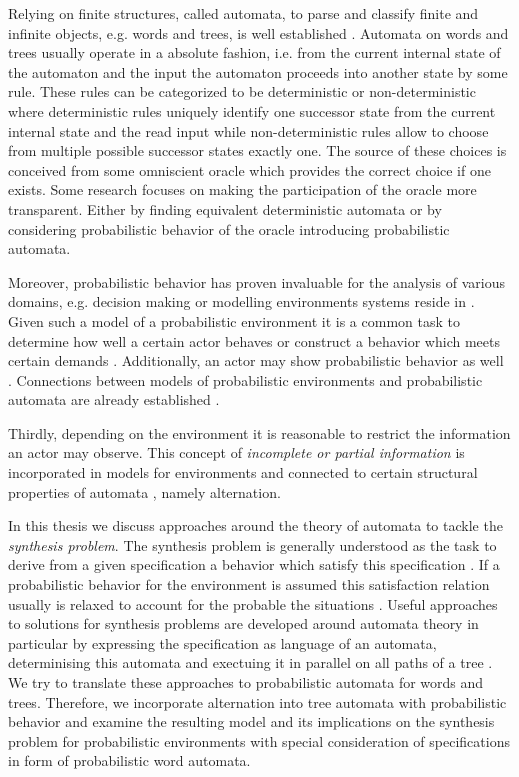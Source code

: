 Relying on finite structures, called automata, to parse and classify finite and
infinite objects, e.g. words and trees, is well established \cite{LangAutoLog,%
AutoInfObj}. Automata on words and trees usually operate in a absolute fashion,
i.e. from the current internal state of the automaton and the input the
automaton proceeds into another state by some rule. These rules can be
categorized to be deterministic or non-deterministic where deterministic rules
uniquely identify one successor state from the current internal state and the
read input while non-deterministic rules allow to choose from multiple possible
successor states exactly one. The source of these choices is conceived from
some omniscient oracle which provides the correct choice if one exists. Some
research focuses on making the participation of the oracle more transparent.
Either by finding equivalent deterministic automata
\cite{NonDetBuechiToDetParity} or by considering probabilistic behavior of the
oracle \cite{RandAutoInfTrees,QualTreeLang,RecOmeLangProbAuto} introducing
probabilistic automata.

Moreover, probabilistic behavior has proven invaluable for the analysis of
various domains, e.g. decision making \cite{ActingOptimallyInPOSD} or modelling
environments systems reside in \cite{PrinciplesOfMC}. Given such a model of a
probabilistic environment it is a common task to determine how well a certain
actor behaves \cite{PrinciplesOfMC} or construct a behavior which meets certain
demands \cite{SynProbEnv,QuanStochParityGames}. Additionally, an actor may show
probabilistic behavior as well \cite{RandomnessForFree}. Connections between
models of probabilistic environments and probabilistic automata are already
established \cite{DecProblemsForProbAuto}.

Thirdly, depending on the environment it is reasonable to restrict the
information an actor may observe. This concept of \emph{incomplete or partial
information} is incorporated in models for environments \cite{QualAnaPOMDP} and
connected to certain structural properties of automata 
\cite{ChurchsProblemRevisited}, namely alternation.

In this thesis we discuss approaches around the theory of automata to tackle
the \emph{synthesis problem}. The synthesis problem is generally understood as
the task to derive from a given specification a behavior which satisfy this
specification \cite{Church}. If a probabilistic behavior for the environment is
assumed this satisfaction relation usually is relaxed to account for the
probable the situations \cite{SynProbEnv,PrinciplesOfMC,QualAnaPOMDP}. Useful
approaches to solutions for synthesis problems are developed around automata
theory in particular by expressing the specification as language of an
automata, determinising this automata and exectuing it in parallel on all paths
of a tree \cite{ChurchsProblemRevisited,SynProbEnv,AutoInfObj,%
ParityGamesPosDet}. We try to translate these approaches to probabilistic
automata for words and trees. Therefore, we incorporate alternation into tree
automata with probabilistic behavior and examine the resulting model and its
implications on the synthesis problem for probabilistic environments with
special consideration of specifications in form of probabilistic word automata.
